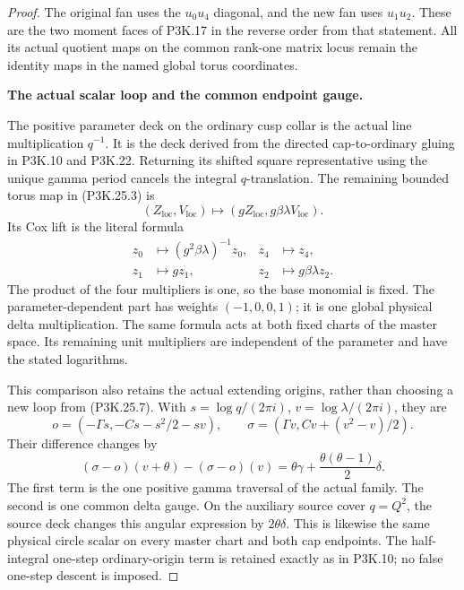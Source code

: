 \begin{proof}
The original fan uses the \(u_0u_4\) diagonal, and the new fan
uses \(u_1u_2\). These are the two moment faces of P3K.17 in
the reverse order from that statement. All its actual quotient
maps on the common rank-one matrix locus remain the identity
maps in the named global torus coordinates.

\par\medskip\noindent\textbf{The actual scalar loop and the common endpoint gauge.}\enspace

The positive parameter deck on the ordinary cusp collar is
the actual line multiplication \(q^{-1}\). It is the deck
derived from the directed cap-to-ordinary gluing in P3K.10
and P3K.22. Returning its shifted square representative using
the unique gamma period cancels the integral \(q\)-translation.
The remaining bounded torus map in (P3K.25.3) is
\[
       (Z_{\mathrm{loc}},V_{\mathrm{loc}})
           \longmapsto(gZ_{\mathrm{loc}},
                             g\beta\lambda V_{\mathrm{loc}}).
                                                        \tag{P3K.25.6}
\]
Its Cox lift is the literal formula
\[
\begin{aligned}
 z_0&\longmapsto(g^2\beta\lambda)^{-1}z_0,
 & z_4&\longmapsto z_4,\\
 z_1&\longmapsto gz_1,
 & z_2&\longmapsto g\beta\lambda z_2 .
\end{aligned}                                          \tag{P3K.25.7}
\]
The product of the four multipliers is one, so the base
monomial is fixed. The parameter-dependent part has weights
\((-1,0,0,1)\); it is one global physical delta multiplication.
The same formula acts at both fixed charts of the master
space. Its remaining unit multipliers are independent of the
parameter and have the stated logarithms.

This comparison also retains the actual extending origins,
rather than choosing a new loop from (P3K.25.7).
With \(s=\log q/(2\pi i)\), \(v=\log\lambda/(2\pi i)\),
they are
\[
 o=(-\Gamma s,-Cs-s^2/2-sv),\qquad
 \sigma=(\Gamma v,Cv+(v^2-v)/2).
\]
Their difference changes by
\[
 (\sigma-o)(v+\theta)-(\sigma-o)(v)
     =\theta\gamma+\frac{\theta(\theta-1)}2\delta.
                                                        \tag{P3K.25.8}
\]
The first term is the one positive gamma traversal of the
actual family. The second is one common delta gauge. On the
auxiliary source cover \(q=Q^2\), the source deck changes this
angular expression by \(2\theta\delta\). This is likewise the
same physical circle scalar on every master chart and both
cap endpoints. The half-integral one-step ordinary-origin
term is retained exactly as in P3K.10; no false one-step
descent is imposed.


\end{proof}
